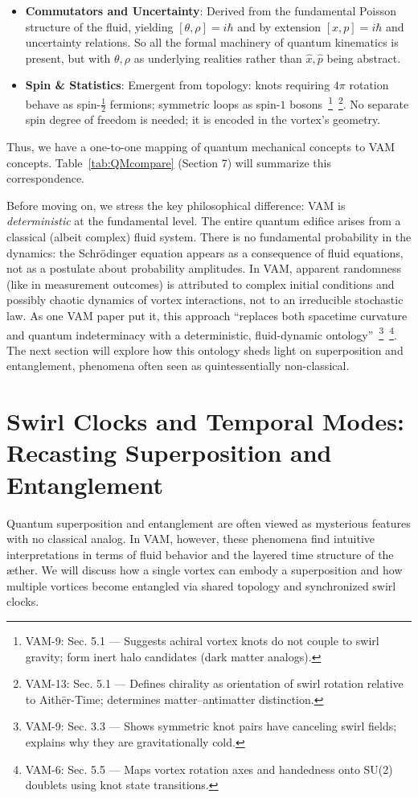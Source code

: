 \documentclass[a4paper,12pt]{article}
\begin{document}
\begin{itemize}
        \item \textbf{Commutators and Uncertainty}: Derived from the fundamental Poisson structure of the fluid, yielding $[\theta, \rho] = i\hbar$ and by extension $[x,p]=i\hbar$ and uncertainty relations. So all the formal machinery of quantum kinematics is present, but with $\theta,\rho$ as underlying realities rather than $\hat{x},\hat{p}$ being abstract.
        \item \textbf{Spin \& Statistics}: Emergent from topology: knots requiring $4\pi$ rotation behave as spin-$\frac{1}{2}$ fermions; symmetric loops as spin-$1$ bosons~\footnote{VAM-9: Sec. 5.1 — Suggests achiral vortex knots do not couple to swirl gravity; form inert halo candidates (dark matter analogs).}~\footnote{VAM-13: Sec. 5.1 — Defines chirality as orientation of swirl rotation relative to Aithēr-Time; determines matter–antimatter distinction.}. No separate spin degree of freedom is needed; it is encoded in the vortex's geometry.
    \end{itemize}
    Thus, we have a one-to-one mapping of quantum mechanical concepts to VAM concepts. Table~\ref{tab:QMcompare} (Section 7) will summarize this correspondence.

    Before moving on, we stress the key philosophical difference: VAM is \emph{deterministic} at the fundamental level. The entire quantum edifice arises from a classical (albeit complex) fluid system. There is no fundamental probability in the dynamics: the Schrödinger equation appears as a consequence of fluid equations, not as a postulate about probability amplitudes. In VAM, apparent randomness (like in measurement outcomes) is attributed to complex initial conditions and possibly chaotic dynamics of vortex interactions, not to an irreducible stochastic law. As one VAM paper put it, this approach “replaces both spacetime curvature and quantum indeterminacy with a deterministic, fluid-dynamic ontology”~\footnote{VAM-9: Sec. 3.3 — Shows symmetric knot pairs have canceling swirl fields; explains why they are gravitationally cold.}~\footnote{VAM-6: Sec. 5.5 — Maps vortex rotation axes and handedness onto SU(2) doublets using knot state transitions.}. The next section will explore how this ontology sheds light on superposition and entanglement, phenomena often seen as quintessentially non-classical.

\section{Swirl Clocks and Temporal Modes: Recasting Superposition and Entanglement}
    Quantum superposition and entanglement are often viewed as mysterious features with no classical analog. In VAM, however, these phenomena find intuitive interpretations in terms of fluid behavior and the layered time structure of the æther. We will discuss how a single vortex can embody a superposition and how multiple vortices become entangled via shared topology and synchronized swirl clocks.
\end{document}
